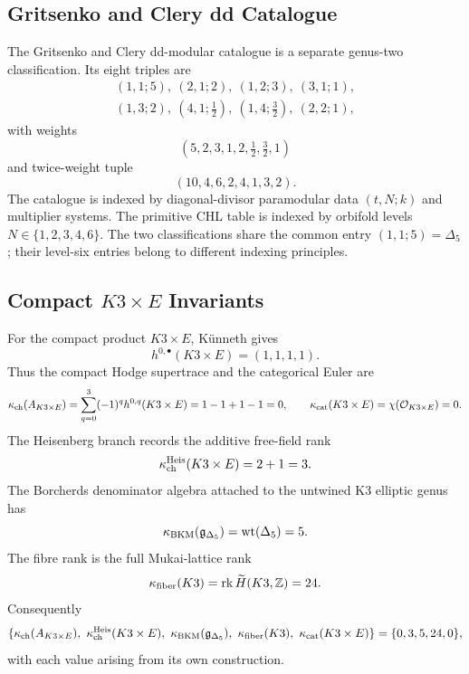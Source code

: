 \subsection*{Gritsenko and Clery dd Catalogue}

The Gritsenko and Clery dd-modular catalogue is a separate genus-two
classification. Its eight triples are
\[
\begin{gathered}
(1,1;5),\ (2,1;2),\ (1,2;3),\ (3,1;1),\\
(1,3;2),\ (4,1;\tfrac12),\ (1,4;\tfrac32),\ (2,2;1),
\end{gathered}
\]
with weights
\[
(5,2,3,1,2,\tfrac12,\tfrac32,1)
\]
and twice-weight tuple
\[
(10,4,6,2,4,1,3,2).
\]
The catalogue is indexed by diagonal-divisor paramodular data
\((t,N;k)\) and multiplier systems. The primitive CHL table is indexed
by orbifold levels \(N\in\{1,2,3,4,6\}\). The two classifications share
the common entry \((1,1;5)=\Delta_5\); their level-six entries belong to
different indexing principles.

\subsection*{Compact \(K3\times E\) Invariants}

For the compact product \(K3\times E\), K\"unneth gives
\[
h^{0,\bullet}(K3\times E)=(1,1,1,1).
\]
Thus the compact Hodge supertrace and the categorical Euler are
\[
\kappa_{\mathrm{ch}}(A_{K3\times E})
=\sum_{q=0}^{3}(-1)^q h^{0,q}(K3\times E)
=1-1+1-1=0,
\qquad
\kappa_{\mathrm{cat}}(K3\times E)=\chi(\mathcal{O}_{K3\times E})=0 .
\]
The Heisenberg branch records the additive free-field rank
\[
\kappa_{\mathrm{ch}}^{\mathrm{Heis}}(K3\times E)=2+1=3.
\]
The Borcherds denominator algebra attached to the untwined K3 elliptic
genus has
\[
\kappa_{\mathrm{BKM}}(\mathfrak g_{\Delta_5})=\mathrm{wt}(\Delta_5)=5.
\]
The fibre rank is the full Mukai-lattice rank
\[
\kappa_{\mathrm{fiber}}(K3)=\operatorname{rk}\widetilde H(K3,\mathbb{Z})=24.
\]
Consequently
\[
\{\kch(A_{K3\times E}),\ \kch^{\mathrm{Heis}}(K3\times E),\
\kBKM(\mathfrak g_{\Delta_5}),\ \kfib(K3),\ \kcat(K3\times E)\}
=\{0,3,5,24,0\},
\]
with each value arising from its own construction.
